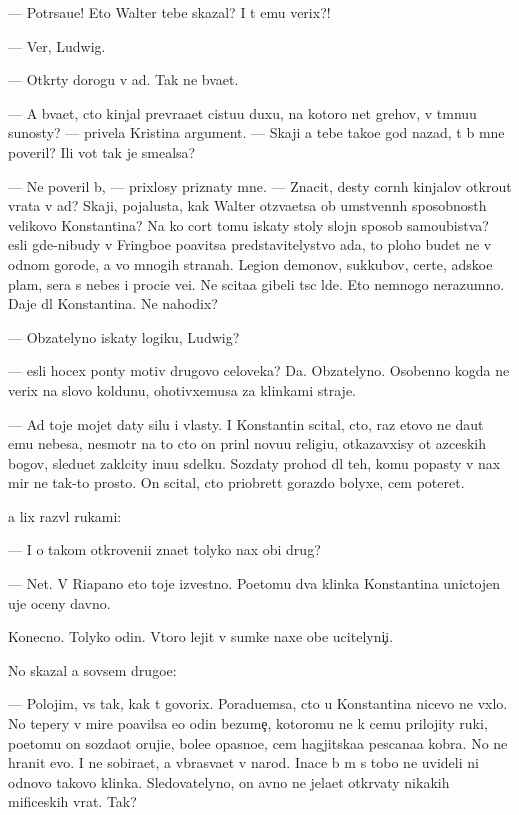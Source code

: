 \documentclass[10pt]{book}
\begin{document}
— Potr{\ia}sa{\y}u{\x}e! Eto Walter tebe skazal? I t{\yi} {\y}emu verix?!

— Ver{\iu}, Ludwig.

— Otkr{\yi}ty dorogu v ad. Tak ne b{\yi}va{\y}et.

— A b{\yi}va{\y}et, cto kinjal prevra{\x}a{\y}et cistu{\y}u duxu, na kotoro{\y} net grehov, v t{\e}mnu{\y}u su{\x}nosty? — privela Kristina argument. — Skaji {\y}a tebe tako{\y}e god nazad, t{\yi} b{\yi} mne poveril? Ili vot tak je sme{\y}alsa?

— Ne poveril b{\yi}, — prixlosy priznaty mne. — Znacit, des{\ia}ty corn{\yi}h kinjalov otkro{\y}ut vrata v ad? Skaji, pojalu{\y}sta, kak Walter otz{\yi}va{\y}etsa ob umstvenn{\yi}h sposobnost{\ia}h velikovo Konstantina? Na ko{\y} cort tomu iskaty stoly slojn{\yi}{\y} sposob samoubi{\y}stva? {\Y}esli gde-nibudy v Fringboe po{\y}avitsa predstavitelystvo ada, to ploho budet ne v odnom gorode, a vo mnogih stranah. Legion{\yi} demonov, sukkubov, certe{\y}, adsko{\y}e plam{\ia}, sera s nebes i proci{\y}e ve{\x}i. Ne scita{\y}a gibeli t{\yi}s{\ia}c l{\iu}de{\y}. Eto nemnogo nerazumno. Daje dl{\ia} Konstantina. Ne nahodix?

— Ob{\ia}zatelyno iskaty logiku, Ludwig?

— {\Y}esli hocex pon{\ia}ty motiv{\yi} drugovo celoveka? Da. Ob{\ia}zatelyno. Osobenno kogda ne verix na slovo koldunu, ohotivxemusa za klinkami straje{\y}.

— Ad toje mojet daty silu i vlasty. I Konstantin scital, cto, raz etovo ne da{\y}ut {\y}emu nebesa, nesmotr{\ia} na to cto on prin{\ia}l novu{\y}u religi{\y}u, otkazavxisy ot {\y}az{\yi}ceskih bogov, sledu{\y}et zakl{\iu}city inu{\y}u sdelku. Sozdaty prohod dl{\ia} teh, komu popasty v nax mir ne tak-to prosto. On scital, cto priobret{\e}t gorazdo bolyxe, cem poter{\ia}{\y}et.

{\Y}a lix razv{\e}l rukami:

— I o takom otkroveni{\y}i zna{\y}et tolyko nax ob{\x}i{\y} drug?

— Net. V Riapano eto toje izvestno. Poetomu dva klinka Konstantina unictojen{\yi} uje oceny davno.

Konecno. Tolyko odin. Vtoro{\y} lejit v sumke naxe{\y} ob{\x}e{\y} ucitelyni{\c}i.

No skazal {\y}a sovsem drugo{\y}e:

— Polojim, vs{\e} tak, kak t{\yi} govorix. Poradu{\y}emsa, cto u Konstantina nicevo ne v{\yi}xlo. No tepery v mire po{\y}avilsa {\y}e{\x}o odin bezume{\c}, kotoromu ne k cemu prilojity ruki, poetomu on sozda{\y}ot oruji{\y}e, bole{\y}e opasno{\y}e, cem hagjitska{\y}a pescana{\y}a kobra. No ne hranit {\y}evo. I ne sobira{\y}et, a v{\yi}bras{\yi}va{\y}et v narod. Inace b{\yi} m{\yi} s tobo{\y} ne uvideli ni odnovo takovo klinka. Sledovatelyno, on {\y}avno ne jela{\y}et otkr{\yi}vaty nikakih mificeskih vrat. Tak?
\end{document}
